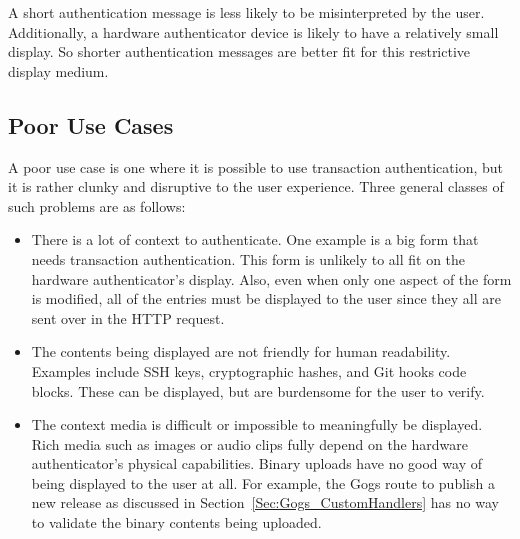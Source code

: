 A short authentication message is less likely to be misinterpreted by the user. Additionally, a hardware authenticator device is likely to have a relatively small display. So shorter authentication messages are better fit for this restrictive display medium. 


\subsection{Poor Use Cases}

A poor use case is one where it is possible to use transaction authentication, but it is rather clunky and disruptive to the user experience. Three general classes of such problems are as follows:

\begin{itemize}[nosep]

\item There is a lot of context to authenticate. One example is a big form that needs transaction authentication. This form is unlikely to all fit on the hardware authenticator's display. Also, even when only one aspect of the form is modified, all of the entries must be displayed to the user since they all are sent over in the HTTP request.

\item The contents being displayed are not friendly for human readability. Examples include SSH keys, cryptographic hashes, and Git hooks code blocks. These can be displayed, but are burdensome for the user to verify.

\item The context media is difficult or impossible to meaningfully be displayed. Rich media such as images or audio clips fully depend on the hardware authenticator's physical capabilities. Binary uploads have no good way of being displayed to the user at all. For example, the Gogs route to publish a new release as discussed in Section~\ref{Sec:Gogs_CustomHandlers} has no way to validate the binary contents being uploaded.


\end{itemize}

